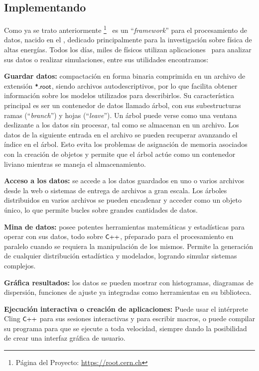 \subsection{Implementando \ROOT}\label{C_root}
Como ya se trato anteriormente \ROOT \footnote{Página del Proyecto: \href{https://root.cern.ch}{https://root.cern.ch}}~ es un ``\textit{framework}'' para el procesamiento de datos, nacido en el \CERN, dedicado principalmente para la investigación sobre física de altas energías. Todos los días, miles de físicos utilizan aplicaciones \ROOT ~para analizar sus datos o realizar simulaciones, entre sus utilidades encontramos:
\begin{itemize_f}
\item \textbf{Guardar datos:} compactación en forma binaria comprimida en un archivo de extensión $\textsf{\small *.root}$, siendo archivos autodescriptivos, por lo que facilita obtener información sobre los modelos utilizados para describirlos. Su característica principal es ser un contenedor de datos llamado árbol, con sus subestructuras ramas (``\textit{branch}'') y hojas (``\textit{leave}''). Un árbol puede verse como una ventana deslizante a los datos sin procesar, tal como se almacenan en un archivo. Los datos de la siguiente entrada en el archivo se pueden recuperar avanzando el índice en el árbol. Esto evita los problemas de asignación de memoria asociados con la creación de objetos y permite que el árbol actúe como un contenedor liviano mientras se maneja el almacenamiento.

\item \textbf{Acceso a los datos:} se accede a los datos guardados en uno o varios archivos \ROOT ~ desde la web o sistemas de entrega de archivos a gran escala. Los árboles \ROOT ~ distribuidos en varios archivos se pueden encadenar y acceder como un objeto único, lo que permite bucles sobre grandes cantidades de datos.

\item \textbf{Mina de datos:} posee potentes herramientas matemáticas y estadísticas para operar con sus datos, todo sobre $\textsf{\small C{++}}$, pŕeparado para el procesamiento en paralelo cuando se requiera la manipulación de los mismos. Permite la generación de cualquier distribución estadística y modelados, logrando simular sistemas complejos.

\item \textbf{Gráfica resultados:} los datos se pueden mostrar con histogramas, diagramas de dispersión, funciones de ajuste ya integradas como herramientas en su biblioteca.

\item \textbf{Ejecución interactiva o creación de aplicaciones:} Puede usar el intérprete Cling $\textsf{\small C++}$ para sus sesiones interactivas y para escribir macros, o puede compilar su programa para que se ejecute a toda velocidad, siempre dando la posibilidad de crear una interfaz gráfica de usuario.
\end{itemize_f}

